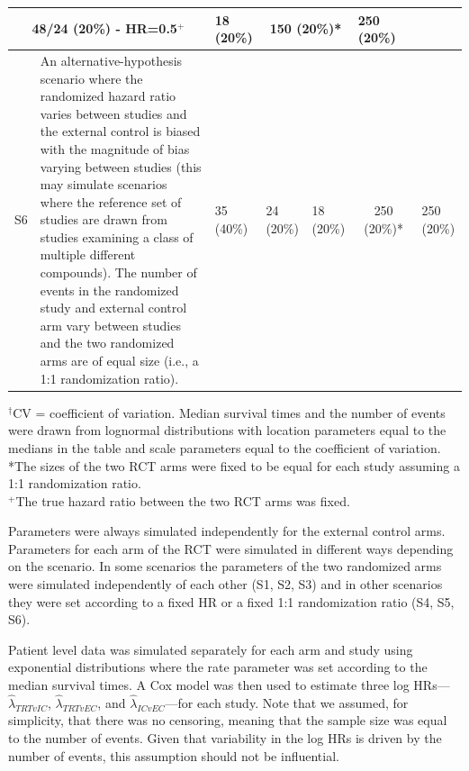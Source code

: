 \documentclass[11pt,final,fleqn]{article}\usepackage[]{graphicx}\usepackage[]{color}
\begin{document}
\begin{table}
\begin{center}
\begin{threeparttable}
\begin{tabular}{lm{6cm}llllll}
\multicolumn{2}{c}{48/24 (20\%) - HR=0.5$^+$} &
18 (20\%) &
\multicolumn{2}{c}{150 (20\%)*} &
250 (20\%) \\
\hline
S6 &
An alternative-hypothesis scenario where the randomized hazard ratio varies between studies and the external control is biased with the magnitude of bias varying between studies (this may simulate scenarios where the reference set of studies are drawn from studies examining a class of multiple different compounds). The number of events in the randomized study and external control arm vary between studies and the two randomized arms are of equal size (i.e., a 1:1 randomization ratio). &
35 (40\%) &
24 (20\%) &
18 (20\%) &
\multicolumn{2}{c}{250 (20\%)*} &
250 (20\%) \\
\hline
\end{tabular}
\scriptsize 
$^\dagger$CV = coefficient of variation. Median survival times and the number of events were drawn from lognormal distributions with location parameters equal to the medians in the table and scale parameters equal to the coefficient of variation. \\
*The sizes of the two RCT arms were fixed to be equal for each study assuming a 1:1 randomization ratio. \\
$^+$The true hazard ratio between the two RCT arms was fixed.
\end{threeparttable}
\end{center}
\end{table}

Parameters were always simulated independently for the external control arms. Parameters for each arm of the RCT were simulated in different ways depending on the scenario. In some scenarios the parameters of the two randomized arms were simulated independently of each other (S1, S2, S3) and in other scenarios they were set according to a fixed HR or a fixed 1:1 randomization ratio (S4, S5, S6).

Patient level data was simulated separately for each arm and study using exponential distributions where the rate parameter was set according to the median survival times. A Cox model was then used to estimate three log HRs---$\hat{\lambda}_{\textit{TRT}vIC}$, $\hat{\lambda}_{\textit{TRT}vEC}$, and $\hat{\lambda}_{ICvEC}$---for each study.  Note that we assumed, for simplicity, that there was no censoring, meaning that the sample size was equal to the number of events. Given that variability in the log HRs is driven by the number of events, this assumption should not be influential. 
\end{document}
